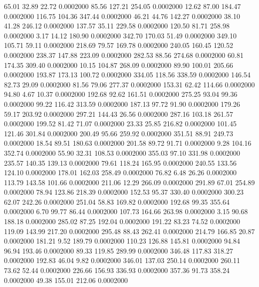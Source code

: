   65.01   32.89   22.72   0.0002000
  85.56  127.21  254.05   0.0002000
  12.62   87.00  184.47   0.0002000
 116.75  104.36  347.44   0.0002000
  46.21   44.76  142.27   0.0002000
  38.10   41.28  246.12   0.0002000
 137.57   35.11  229.58   0.0002000
 120.50   81.71  258.98   0.0002000
   3.17   14.12  180.90   0.0002000
 342.70  170.03   51.49   0.0002000
 349.10  105.71   59.11   0.0002000
 218.69   79.57  169.78   0.0002000
 240.05  160.45  120.52   0.0002000
 238.37  147.88  223.09   0.0002000
 282.53   88.56  274.68   0.0002000
  60.81  174.35  309.40   0.0002000
  10.15  104.87  268.09   0.0002000
  89.90  100.01  205.66   0.0002000
 193.87  173.13  100.72   0.0002000
 334.05  118.56  338.59   0.0002000
 146.54   82.73   29.09   0.0002000
  81.56   79.06  277.37   0.0002000
 153.31   62.42  114.66   0.0002000
  94.80    4.67   10.37   0.0002000
 192.68   92.62  161.51   0.0002000
 275.25   93.04   99.36   0.0002000
  99.22  116.42  313.59   0.0002000
 187.13   97.72   91.90   0.0002000
 179.26   59.17  203.92   0.0002000
 297.21  144.43   26.56   0.0002000
 287.16  103.18  261.57   0.0002000
 199.52   81.42   71.07   0.0002000
  23.33   25.85  216.82   0.0002000
 101.45  121.46  301.84   0.0002000
 200.49   95.66  259.92   0.0002000
 351.51   88.91  249.73   0.0002000
  18.54   89.51  180.63   0.0002000
 201.58   89.72   91.71   0.0002000
   9.28  104.16  352.74   0.0002000
  55.90   32.31  108.53   0.0002000
 355.03   97.10  331.98   0.0002000
 235.57  140.35  139.13   0.0002000
  79.61  118.24  165.95   0.0002000
 240.55  133.56  124.10   0.0002000
 178.01  162.03  258.49   0.0002000
  76.82    6.48   26.26   0.0002000
 113.79  143.58  101.66   0.0002000
 211.06   12.29  266.09   0.0002000
 291.89   67.01  254.89   0.0002000
  78.94  123.86  218.39   0.0002000
 152.53   95.37  330.40   0.0002000
 300.23   62.07  242.26   0.0002000
 251.04   58.83  169.82   0.0002000
 192.68   99.35  355.64   0.0002000
   6.70   99.77   86.44   0.0002000
 107.73  164.66  263.98   0.0002000
   3.15   90.68  188.18   0.0002000
 285.02   87.25  192.04   0.0002000
 191.22   83.23   74.52   0.0002000
 119.09  143.99  217.20   0.0002000
 295.48   88.43  262.41   0.0002000
 214.79  166.85   20.87   0.0002000
 181.21    9.52  189.79   0.0002000
 110.23  126.88  145.81   0.0002000
  94.84   96.94  193.46   0.0002000
  89.33  119.85  289.99   0.0002000
 346.48  117.83  318.27   0.0002000
 192.83   46.04    9.82   0.0002000
 346.01  137.03  250.14   0.0002000
 260.11   73.62   52.44   0.0002000
 226.66  156.93  336.93   0.0002000
 357.36   91.73  358.24   0.0002000
  49.38  155.01  212.06   0.0002000

